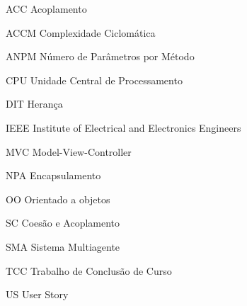 \begin{siglas}

\item [ACC] Acoplamento
\item [ACCM] Complexidade Ciclomática
\item [ANPM] Número de Parâmetros por Método
\item [CPU] Unidade Central de Processamento
\item [DIT] Herança
\item [IEEE] Institute of Electrical and Electronics Engineers
\item [MVC] Model-View-Controller
\item [NPA] Encapsulamento
\item [OO] Orientado a objetos
\item [SC] Coesão e Acoplamento
\item [SMA] Sistema Multiagente
\item [TCC] Trabalho de Conclusão de Curso
\item [US] User Story
\end{siglas}

